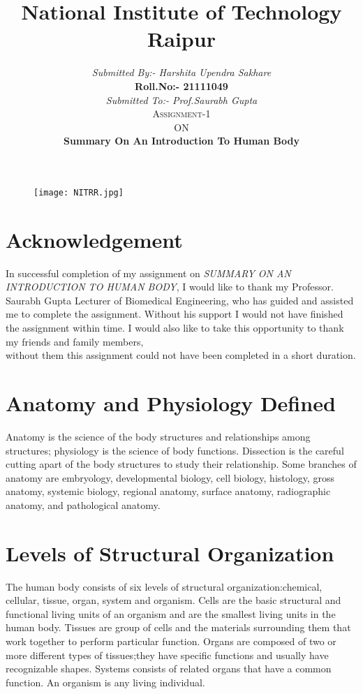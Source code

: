 \documentclass[12pt]{article}
\begin{document}
\title{\huge National Institute of Technology Raipur}
\begin{figure}
\centering
\texttt{[image: NITRR.jpg]}
\end{figure}
\author{\textit{Submitted By:- Harshita Upendra Sakhare}\\ \textbf{Roll.No:- 21111049}\\ \textit{Submitted To:- Prof.Saurabh Gupta}\\ \textsc{Assignment-1}\\ \textsc{ON}\\ \textbf{Summary On An Introduction To Human Body}}

\maketitle
\clearpage
\tableofcontents
\clearpage

\section{Acknowledgement}
\hspace{1cm}
In successful completion of my assignment on \textit{ SUMMARY ON AN INTRODUCTION TO HUMAN BODY}, I would like to thank my
Professor. Saurabh Gupta Lecturer of Biomedical Engineering, who
has guided and assisted me to complete the assignment. Without
his support I would not have finished the assignment within time.
I would also like to take this opportunity to thank my friends
and family members,\\without them this assignment could not have
been completed in a short duration.
\clearpage

\section{Anatomy and Physiology Defined}
\hspace{1cm}
Anatomy is the science of the body structures and relationships among structures; physiology is the science of body functions. Dissection is the careful cutting apart of the body structures to study their relationship. Some branches of anatomy are embryology, developmental biology, cell biology, histology, gross anatomy, systemic biology, regional anatomy, surface anatomy, radiographic anatomy, and pathological anatomy.


\section{Levels of Structural Organization}
\hspace{1cm}
The human body consists of six levels of structural organization:chemical, cellular, tissue, organ, system and organism. Cells are the basic structural and functional living units of an organism and are the smallest living units in the human body. Tissues are group of cells and the materials surrounding them that work together to perform particular function. Organs are composed of two or more different types of tissues;they have specific functions and usually have recognizable shapes. Systems consists of related organs that have a common function. An organism is any living individual.
\end{document}
